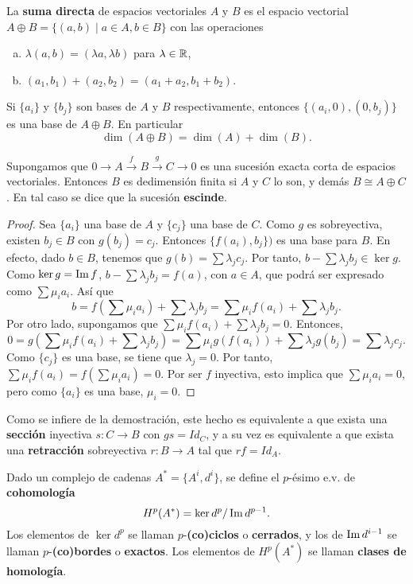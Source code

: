 \documentclass[CV.tex]{subfiles}
\begin{document}
\begin{defi}
La \textbf{suma directa} de espacios vectoriales $A$ y $B$ es el espacio vectorial $A\oplus B=\{(a,b)\mid a\in A,b\in B\}$ con las operaciones 
\begin{enumerate}[a.]
\item $\lambda(a,b)=(\lambda a,\lambda b)$ para $\lambda\in\mathbb{R}$,
\item $(a_1,b_1)+(a_2,b_2)=(a_1+a_2,b_1+b_2)$.
\end{enumerate}
\end{defi}

Si $\{a_i\}$ y $\{b_j\}$ son bases de $A$ y $B$ respectivamente, entonces $\{(a_i,0), (0,b_j)\}$ es una base de $A\oplus B$. En particular
\[
\dim(A\oplus B)=\dim(A)+\dim(B).
\]
\begin{lemma}\label{sum}
Supongamos que $0\to A\overset{f}{\to}B\overset{g}{\to}C\to 0$ es una sucesión exacta corta de espacios vectoriales. Entonces $B$ es dedimensión finita si $A$ y $C$ lo son, y demás $B\cong A\oplus C$. En tal caso se dice que la sucesión \textbf{escinde}.
\end{lemma}
\begin{proof}
Sea $\{a_i\}$ una base de $A$ y $\{c_j\}$ una base de $C$. Como $g$ es sobreyectiva, existen $b_j\in B$ con $g(b_j)=c_j$. Entonces $\{f(a_i),b_j\})$ es una base para $B$. En efecto, dado $b\in B$, tenemos que $g(b)=\sum\lambda_jc_j$. Por tanto, $b-\sum\lambda_jb_j\in\ker{g}$. Como $\ker{g}=\operatorname{Im}{f}$, $b-\sum\lambda_jb_j=f(a)$, con $a\in A$, que podrá ser expresado como $\sum\mu_ia_i$. Así que
\[
b=f\left(\sum\mu_ia_i\right)+\sum\lambda_jb_j=\sum\mu_if(a_i)+\sum\lambda_jb_j.
\]
Por otro lado, supongamos que $\sum\mu_if(a_i)+\sum\lambda_jb_j=0$. Entonces, 
\[
0=g\left(\sum\mu_if(a_i)+\sum\lambda_jb_j\right)=\sum\mu_ig(f(a_i))+\sum\lambda_jg(b_j)=\sum\lambda_j c_j.
\]
Como $\{c_j\}$ es una base, se tiene que $\lambda_j=0$. Por tanto, $\sum\mu_if(a_i)=f\left(\sum\mu_ia_i\right)=0$. Por ser $f$ inyectiva, esto implica que $\sum\mu_ia_i=0$, pero como $\{a_i\}$ es una base, $\mu_i=0$.  
\end{proof}

Como se infiere de la demostración, este hecho es equivalente a que exista una \textbf{sección} inyectiva $s:C\to B$ con $gs=Id_C$, y a su vez es equivalente a que exista una \textbf{retracción} sobreyectiva $r:B\to A$ tal que $rf=Id_A$.

\begin{defi}
Dado un complejo de cadenas $A^*=\{A^i,d^i\}$, se define el $p$-ésimo e.v. de \textbf{cohomología}
\[
H^p(A^*)=\ker{d^p}/\operatorname{Im}{d^{p-1}}.
\]
Los elementos de $\ker{d^p}$ se llaman $p$-\textbf{(co)ciclos} o \textbf{cerrados}, y los de $\operatorname{Im}{d^{i-1}}$ se llaman $p$-\textbf{(co)bordes} o \textbf{exactos}. Los elementos de $H^p(A^*)$ se llaman \textbf{clases de homología}.
\end{defi}
\end{document}
